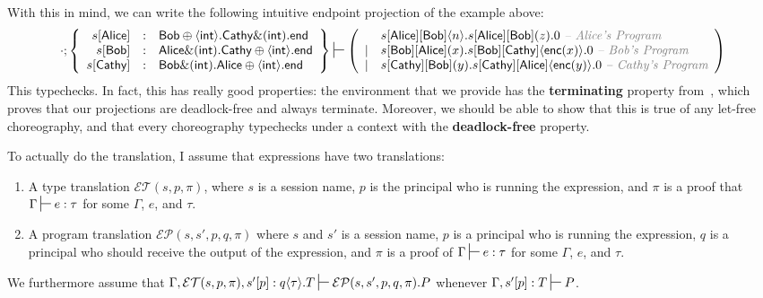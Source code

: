 \documentclass{article}
\theoremstyle{definition}
\newcommand{\proves}[1][]{\sststile{}{#1}}
\begin{document}
With this in mind, we can write the following intuitive endpoint projection of the example above:
$$
\cdot; \left\{
  \begin{array}{rcl}
    s[\textsf{Alice}] & : & \textsf{Bob}\oplus\langle \textsf{int}\rangle. \textsf{Cathy}\&(\textsf{int}). \textsf{end}\\
    s[\textsf{Bob}]   & : & \textsf{Alice}\&(\textsf{int}). \textsf{Cathy}\oplus\langle \textsf{int}\rangle. \textsf{end}\\
    s[\textsf{Cathy}] & : & \textsf{Bob}\&(\textsf{int}). \textsf{Alice}\oplus\langle \textsf{int}\rangle. \textsf{end}\\
  \end{array}\right\}
\proves
\left(
  \begin{array}{ll}
      & s[\textsf{Alice}][\textsf{Bob}]\langle n\rangle. s[\textsf{Alice}][\textsf{Bob}](z).0~\textcolor{gray}{\textit{-- Alice's Program}}\\
    | & s[\textsf{Bob}][\textsf{Alice}](x). s[\textsf{Bob}][\textsf{Cathy}]\langle \textsf{enc}(x)\rangle. 0~\textcolor{gray}{\textit{-- Bob's Program}}\\
    | & s[\textsf{Cathy}][\textsf{Bob}](y). s[\textsf{Cathy}][\textsf{Alice}]\langle \textsf{enc}(y)\rangle.0~\textcolor{gray}{\textit{-- Cathy's Program}}\\
  \end{array}
\right)
$$
This typechecks.
In fact, this has really good properties: the environment that we provide has the \textbf{terminating} property from~\citet{ScalasY19}, which proves that our projections are deadlock-free and always terminate.
Moreover, we should be able to show that this is true of any \textsf{let}-free choreography, and that every choreography typechecks under a context with the \textbf{deadlock-free} property.

\newcommand{\ET}{\mathcal{E}\mathcal{T}}
\newcommand{\EP}{\mathcal{E}\mathcal{P}}
\newcommand{\CT}{\mathcal{C}\mathcal{T}}
\newcommand{\CP}{\mathcal{C}\mathcal{P}}
To actually do the translation, I assume that expressions have two translations:
\begin{enumerate}
\item A type translation $\ET(s, p, \pi)$, where $s$ is a session name, $p$ is the principal who is running the expression, and $\pi$ is a proof that $\Gamma \proves e : \tau$ for some $\Gamma$, $e$, and $\tau$.
\item A program translation $\EP(s, s', p, q, \pi)$ where $s$ and $s'$ is a session name, $p$ is a principal who is running the expression, $q$ is a principal who should receive the output of the expression, and $\pi$ is a proof of $\Gamma \proves e : \tau$ for some $\Gamma$, $e$, and $\tau$.
\end{enumerate}
We furthermore assume that $\Gamma, \ET(s,p,\pi), s'[p] : q\langle \tau \rangle.T \proves \EP(s,s',p,q,\pi).P$ whenever $\Gamma, s'[p] : T \proves P$.
\end{document}
